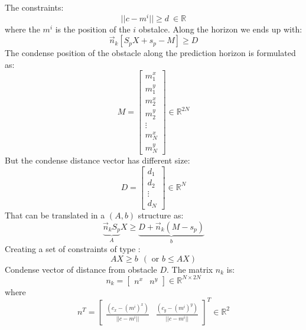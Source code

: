 The constraints:
\begin{equation}
		||c-m^i||\geq d\:\in\mathbb{R}
\end{equation}
where the $m^i$ is the position of the $i$ obstalce. Along the horizon we ends up with:
\begin{equation}
	\vec{n}_k\left[S_pX + s_p - M\right] \geq D
\end{equation}
The condense position of the obstacle along the prediction horizon is formulated as:
\begin{equation}
M = \begin{bmatrix}m^x_1\\m^y_1\\m^x_2\\m^y_2\\\vdots\\m^x_N\\m^y_N\end{bmatrix}\in\mathbb{R}^{2N}
\end{equation}
But the condense distance vector has different size:
\begin{equation}
D = \begin{bmatrix}d_1\\d_2\\\vdots\\d_N\end{bmatrix}\in\mathbb{R}^{N}
\end{equation}
That can be translated in a $(A,b)$ structure as:
\begin{equation}
\underbrace{\vec{n}_kS_p}_{A}X \geq \underbrace{D + \vec{n}_k\left(M - s_p\right)}_{b}
\end{equation}
Creating a set of constraints of type :
\begin{equation}
AX \geq b \:\:(\text{ or $b \leq AX$} )
\end{equation}
Condense vector of distance from obstacle $D$. The matrix $n_k$ is:
\begin{equation}
		n_k=\begin{bmatrix}n^x&n^y\end{bmatrix}\in\mathbb{R}^{N\times 2N}
\end{equation}
where
\begin{equation}
n^T=\begin{bmatrix}\frac{(c_x-(m^i)^x)}{||c-m^i||}&\frac{(c_y-(m^i)^y)}{||c-m^i||}\end{bmatrix}^T\in\mathbb{R}^2
\end{equation}	

